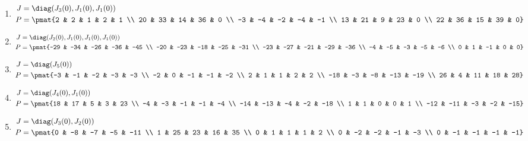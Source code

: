 \begin{enumerate}
\item

\begin{align*}
J &= \diag(J_{3}(0), J_{1}(0), J_{1}(0))\\
P &= \pmat{2 & 2 & 1 & 2 & 1 \\ 20 & 33 & 14 & 36 & 0 \\ -3 & -4 & -2 & -4 & -1 \\ 13 & 21 & 9 & 23 & 0 \\ 22 & 36 & 15 & 39 & 0}
\end{align*}

\item

\begin{align*}
J &= \diag(J_{2}(0), J_{1}(0), J_{1}(0), J_{1}(0))\\
P &= \pmat{-29 & -34 & -26 & -36 & -45 \\ -20 & -23 & -18 & -25 & -31 \\ -23 & -27 & -21 & -29 & -36 \\ -4 & -5 & -3 & -5 & -6 \\ 0 & 1 & -1 & 0 & 0}
\end{align*}

\item

\begin{align*}
J &= \diag(J_{5}(0))\\
P &= \pmat{-3 & -1 & -2 & -3 & -3 \\ -2 & 0 & -1 & -1 & -2 \\ 2 & 1 & 1 & 2 & 2 \\ -18 & -3 & -8 & -13 & -19 \\ 26 & 4 & 11 & 18 & 28}
\end{align*}

\item

\begin{align*}
J &= \diag(J_{4}(0), J_{1}(0))\\
P &= \pmat{18 & 17 & 5 & 3 & 23 \\ -4 & -3 & -1 & -1 & -4 \\ -14 & -13 & -4 & -2 & -18 \\ 1 & 1 & 0 & 0 & 1 \\ -12 & -11 & -3 & -2 & -15}
\end{align*}

\item

\begin{align*}
J &= \diag(J_{3}(0), J_{2}(0))\\
P &= \pmat{0 & -8 & -7 & -5 & -11 \\ 1 & 25 & 23 & 16 & 35 \\ 0 & 1 & 1 & 1 & 2 \\ 0 & -2 & -2 & -1 & -3 \\ 0 & -1 & -1 & -1 & -1}
\end{align*}


\end{enumerate}
